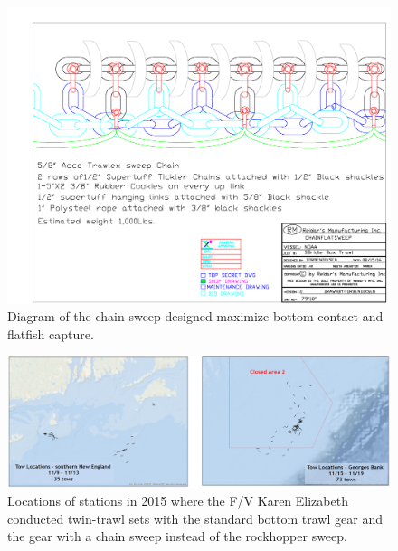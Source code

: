 \documentclass[]{article}
\begin{document}
\begin{figure}
\caption{Diagram of the chain sweep designed maximize bottom contact and flatfish capture.}\label{chainsweep_schematic}
\begin{center}
\includegraphics[width = \textwidth]{chainsweep_schematic.pdf}
\end{center}
\end{figure}
\clearpage

\begin{figure}
\caption{Locations of stations in 2015 where the F/V Karen Elizabeth conducted twin-trawl sets with the standard bottom trawl gear and the gear with a chain sweep instead of the rockhopper sweep.}\label{2015_tow_locations}
\begin{center}
\includegraphics[width = \textwidth]{2015_tow_locations.png}
\end{center}
\end{figure}
\end{document}
